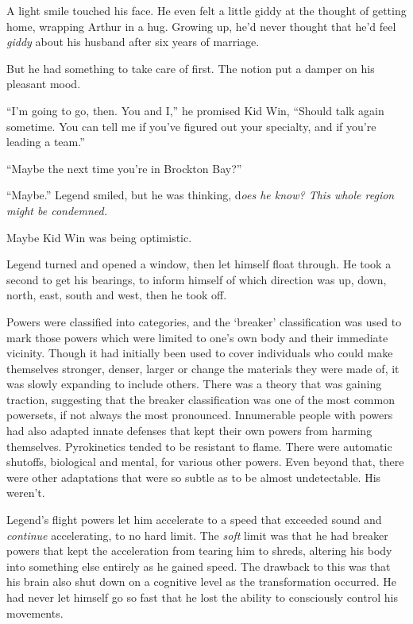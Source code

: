 A light smile touched his face.  He even felt a little giddy at the thought of getting home, wrapping Arthur in a hug.  Growing up, he'd never thought that he'd feel \emph{giddy} about his husband after six years of marriage.



But he had something to take care of first.  The notion put a damper on his pleasant mood.



``I'm going to go, then.  You and I,'' he promised Kid Win, ``Should talk again sometime.  You can tell me if you've figured out your specialty, and if you're leading a team.''



``Maybe the next time you're in Brockton Bay?''



``Maybe.''  Legend smiled, but he was thinking, d\emph{oes he know?  This whole region might be condemned.}



Maybe Kid Win was being optimistic.



Legend turned and opened a window, then let himself float through.  He took a second to get his bearings, to inform himself of which direction was up, down, north, east, south and west, then he took off.



Powers were classified into categories, and the `breaker' classification was used to mark those powers which were limited to one's own body and their immediate vicinity.  Though it had initially been used to cover individuals who could make themselves stronger, denser, larger or change the materials they were made of, it was slowly expanding to include others.  There was a theory that was gaining traction, suggesting that the breaker classification was one of the most common powersets, if not always the most pronounced.  Innumerable people with powers had also adapted innate defenses that kept their own powers from harming themselves.  Pyrokinetics tended to be resistant to flame. There were automatic shutoffs, biological and mental, for various other powers.  Even beyond that, there were other adaptations that were so subtle as to be almost undetectable.  His weren't.



Legend's flight powers let him accelerate to a speed that exceeded sound and \emph{continue} accelerating, to no hard limit.  The \emph{soft} limit was that he had breaker powers that kept the acceleration from tearing him to shreds, altering his body into something else entirely as he gained speed.  The drawback to this was that his brain also shut down on a cognitive level as the transformation occurred.  He had never let himself go so fast that he lost the ability to consciously control his movements.



